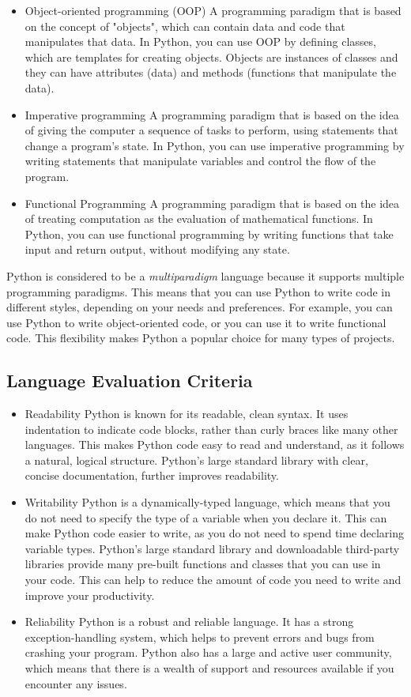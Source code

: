 \documentclass{article}
\begin{document}
\begin{itemize}
  \item Object-oriented programming (OOP)
    \subitem A programming paradigm that is based on the concept of "objects", which can contain data and code that manipulates that data. In Python, you can use OOP by defining classes, which are templates for creating objects. Objects are instances of classes and they can have attributes (data) and methods (functions that manipulate the data).
  \item Imperative programming
    \subitem A programming paradigm that is based on the idea of giving the computer a sequence of tasks to perform, using statements that change a program's state. In Python, you can use imperative programming by writing statements that manipulate variables and control the flow of the program.
  \item Functional Programming 
    \subitem A programming paradigm that is based on the idea of treating computation as the evaluation of mathematical functions. In Python, you can use functional programming by writing functions that take input and return output, without modifying any state.
\end{itemize}

Python is considered to be a \emph{multiparadigm} language because it supports multiple programming paradigms. This means that you can use Python to write code in different styles, depending on your needs and preferences. For example, you can use Python to write object-oriented code, or you can use it to write functional code. This flexibility makes Python a popular choice for many types of projects.
\subsection*{Language Evaluation Criteria}
\begin{itemize}
  \item Readability
    \subitem Python is known for its readable, clean syntax. It uses indentation to indicate code blocks, rather than curly braces like many other languages. This makes Python code easy to read and understand, as it follows a natural, logical structure. Python's large standard library with clear, concise documentation, further improves readability.
  \item Writability
    \subitem Python is a dynamically-typed language, which means that you do not need to specify the type of a variable when you declare it. This can make Python code easier to write, as you do not need to spend time declaring variable types. Python's large standard library and downloadable third-party libraries provide many pre-built functions and classes that you can use in your code. This can help to reduce the amount of code you need to write and improve your productivity.
  \item Reliability 
    \subitem Python is a robust and reliable language. It has a strong exception-handling system, which helps to prevent errors and bugs from crashing your program. Python also has a large and active user community, which means that there is a wealth of support and resources available if you encounter any issues.
\end{itemize}
\end{document}
